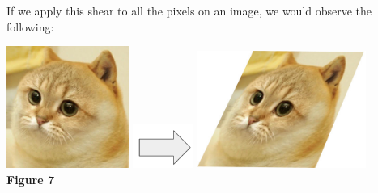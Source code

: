 \documentclass{article}
\begin{document}
\par\noindent If we apply this shear to all the pixels on an image, we would observe the following:

\begin{center}
	\includegraphics[width=4cm]{cate-original.jpg}
	\includegraphics[width=2cm]{r-arrow.png}
	\includegraphics[width=5.5cm]{cate-sheared.jpg}\\
	\textbf{Figure 7}
\end{center}
\end{document}
